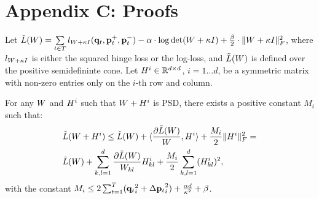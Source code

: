 \documentclass{article}
\begin{document}
\section*{Appendix C: Proofs}
\label{appendix-proofs}

\begin{applemma}
\label{applem:smooth}
Let $\tilde{L}({W})=\sum\limits_{t\in T}{l_{{W} + \kappa I}(\mathbf{q}_t, \mathbf{p}_{t}^{+}, \mathbf{p}_{t}^{-})} - \alpha \cdot \log \det({W} + \kappa I) + \tfrac{\beta}{2}  \cdot \| {W} + \kappa I \|_{F}^{2}$, where $l_{{W} + \kappa I}$ is either the squared hinge loss or the log-loss, and $\tilde{L}({W})$ is defined over the positive semidefininte cone. 
Let ${H}^i \in \mathbb{R}^{d \times d}$, $i=1 \ldots d$, be a symmetric matrix with non-zero entries only on the $i$-th row and column.

For any ${W}$ and ${H}^i$ such that ${W} + {H}^i$ is PSD, there exists a positive constant $M_i$ such that:
\begin{align}
\label{eq:ineq}
&\tilde{L}({W} + {H}^i) \leq \tilde{L}({W}) + \langle \frac{\partial \tilde{L}({W})}{{W}}, {H}^i \rangle + \frac{M_i}{2} {\|{H}^i\|_F^2} = \\
&\tilde{L}({W}) + \sum_{k,l=1}^d  \frac{\partial \tilde{L}({W})}{{W}_{kl}} {H}_{kl}^i + \frac{M_i}{2} \sum_{k,l=1}^d  ({H}_{kl}^i)^2, \nonumber
\end{align}
with the constant $M_i \leq  2 \sum_{t=1}^T ({{\mathbf{q}}_{{t}}}_i^2 +{\Delta\mathbf{p}_{t}}_i^2) + \frac{\alpha d}{\kappa ^2} + \beta$.

\end{applemma}
\end{document}
